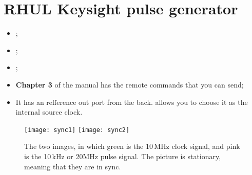 \section{RHUL Keysight pulse generator}
 \begin{itemize}
 	\item {};
 	\item {};
 	\item {};
 	\item \textbf{Chapter 3} of the manual has the remote commands that you can send;
 	\item It has an refference out port from the back.  allows you to choose it as the internal source clock. 
 \end{itemize}

	\begin{figure}
		\centering
		\texttt{[image: sync1]}
		\texttt{[image: sync2]}
		\caption{The two images, in which green is the 10\,MHz clock signal, and pink is the 10\,kHz or 20MHz pulse signal. The picture is stationary, meaning that they are in sync.}
	\end{figure}
 
 \newpage
 
